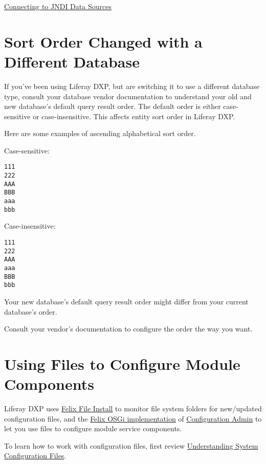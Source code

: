 \href{/docs/7-2/appdev/-/knowledge_base/a/connecting-to-data-sources-using-jndi}{Connecting
to JNDI Data Sources}

\chapter{Sort Order Changed with a Different
Database}\label{sort-order-changed-with-a-different-database}

If you've been using Liferay DXP, but are switching it to use a
different database type, consult your database vendor documentation to
understand your old and new database's default query result order. The
default order is either case-sensitive or case-insensitive. This affects
entity sort order in Liferay DXP.

Here are some examples of ascending alphabetical sort order.

Case-sensitive:

\begin{verbatim}
111
222
AAA
BBB
aaa
bbb
\end{verbatim}

Case-insensitive:

\begin{verbatim}
111
222
AAA
aaa
BBB
bbb
\end{verbatim}

Your new database's default query result order might differ from your
current database's order.

Consult your vendor's documentation to configure the order the way you
want.

\chapter{Using Files to Configure Module
Components}\label{using-files-to-configure-module-components}

Liferay DXP uses
\href{http://felix.apache.org/documentation/subprojects/apache-felix-file-install.html}{Felix
File Install} to monitor file system folders for new/updated
configuration files, and the \href{http://felix.apache.org/}{Felix OSGi
implementation} of
\href{http://felix.apache.org/documentation/subprojects/apache-felix-config-admin.html}{Configuration
Admin} to let you use files to configure module service components.

To learn how to work with configuration files, first review
\href{/docs/7-1/user/-/knowledge_base/u/understanding-system-configuration-files}{Understanding
System Configuration Files}.

